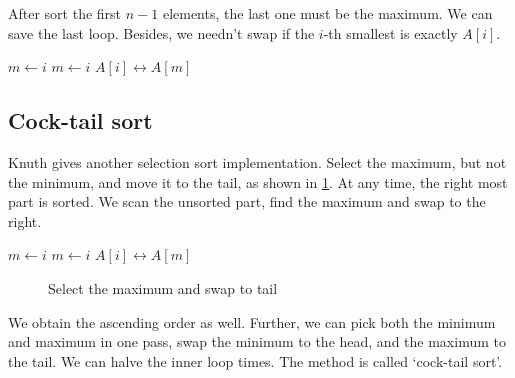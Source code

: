 \documentclass[b5paper]{article}
\begin{document}
After sort the first $n-1$ elements, the last one must be the maximum. We can save the last loop. Besides, we needn't swap if the $i$-th smallest is exactly $A[i]$.

\begin{algorithmic}[1]
    \State $m \gets i$
        \State $m \gets i$
      \EndIf
    \EndFor
      \State {} $A[i] \leftrightarrow A[m]$
    \EndIf
  \EndFor
\EndProcedure
\end{algorithmic}

\subsection{Cock-tail sort}

Knuth gives another selection sort implementation\cite{TAOCP}. Select the maximum, but not the minimum, and move it to the tail, as shown in \cref{fig:knuth-ssort}. At any time, the right most part is sorted. We scan the unsorted part, find the maximum and swap to the right.

\begin{algorithmic}[1]
    \State $m \gets i$
        \State $m \gets i$
      \EndIf
    \EndFor
    \State {} $A[i] \leftrightarrow A[m]$
  \EndFor
\EndProcedure
\end{algorithmic}

\begin{figure}[htbp]
  \centering
  \caption{Select the maximum and swap to tail}
  \label{fig:knuth-ssort}
\end{figure}

We obtain the ascending order as well. Further, we can pick both the minimum and maximum in one pass, swap the minimum to the head, and the maximum to the tail. We can halve the inner loop times. The method is called `cock-tail sort'.
\end{document}
